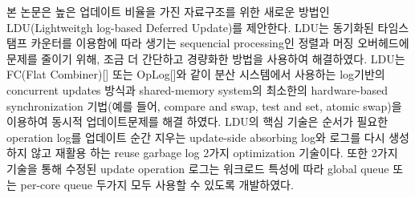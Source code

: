 %
\ifkor
본 논문은 높은 업데이트 비율을 가진 자료구조를 위한 새로운 방법인 LDU(Lightweitgh log-based Deferred
Update)를 제안한다.
LDU는 동기화된 타임스탬프 카운터를 이용함에 따라 생기는 sequencial processing인 정렬과 머징 오버헤드에 문제를
줄이기 위해, 조금 더 간단하고 경량화한 방법을 사용하여 해결하였다.
LDU는 FC(Flat Combiner)[] 또는 OpLog[]와 같이 분산 시스템에서 사용하는 log기반의 concurrent
updates 방식과 shared-memory system의 최소한의 hardware-based synchronization 기법(예를 들어, compare and
swap, test and set, atomic swap)을 이용하여 동시적 업데이트문제를 해결 하였다.
LDU의 핵심 기술은 순서가 필요한 operation log를 업데이트 순간 지우는 update-side absorbing log와
로그를 다시 생성하지 않고 재활용 하는 reuse garbage log 2가지 optimization 기술이다.
또한 2가지 기술을 통해 수정된 update operation 로그는 워크로드 특성에 따라 global queue 또는 per-core
queue 두가지 모두 사용할 수 있도록 개발하였다. 
\else
\fi

